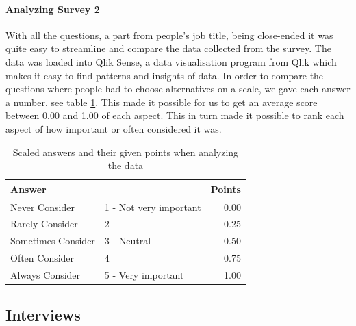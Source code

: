 \documentclass{article}
\begin{document}
\paragraph{Analyzing Survey 2}
With all the questions, a part from people's job title, being close-ended it was quite easy to streamline and compare the data collected from the survey. The data was loaded into Qlik Sense, a data visualisation program from Qlik which makes it easy to find patterns and insights of data. In order to compare the questions where people had to choose alternatives on a scale, we gave each answer a number, see table \ref{tabl:points}.
This made it possible for us to get an average score between 0.00 and 1.00 of each aspect. This in turn made it possible to rank each aspect of how important or often considered it was.
\begin{table}[H]
\centering
\begin{tabular}{l l|r}
\multicolumn{2}{l}{\textbf{Answer}} & \textbf{Points} \\ \hline
Never Consider & 1 - Not very important & 0.00  \\ \hline
Rarely Consider & 2 & 0.25 \\ \hline
Sometimes Consider & 3 - Neutral & 0.50 \\ \hline
Often Consider & 4 & 0.75 \\ \hline
Always Consider & 5 - Very important & 1.00 \\ \hline
\end{tabular}
\caption{Scaled answers and their given points when analyzing the data}
\label{tabl:points}
\end{table}

\subsection{Interviews}
\end{document}
